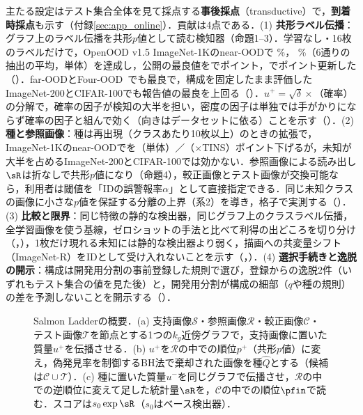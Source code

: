 主たる設定はテスト集合全体を見て採点する\textbf{事後採点}（transductive）で，\textbf{到着時採点}も示す（付録\ref{sec:app_online}）．貢献は4点である．(1) \textbf{共形ラベル伝播}：グラフ上のラベル伝播を共形$p$値として読む検知器（命題1--3）．学習なし・16枚のラベルだけで，OpenOOD v1.5 ImageNet-1Kのnear-OODで\AUC{} \NRAloneNearAuroc\%，\FPR{} \NRAloneNearFpr\%（6通りの抽出の平均，単体）を達成し，公開の最良値を\AUC{}で\NRAloneGapNearAuroc{}ポイント，\FPR{}で\NRAloneGapNearFpr{}ポイント更新した（）．far-OODとFour-OOD~\cite{huang2021mos}でも最良で，構成を固定したまま評価したImageNet-200とCIFAR-100でも報告値の最良を上回る（）．$u^{+}=\sqrt{\delta}\times$（確率）の分解で，確率の因子が検知の大半を担い，密度の因子は単独では手がかりにならず確率の因子と組んで効く（向きはデータセットに依る）ことを示す（）．(2) \textbf{種と参照画像}：種は再出現（クラスあたり10枚以上）のときの拡張で，ImageNet-1Kのnear-OODで\FPR{}を\NRvsLpAloneNearDAbs{}（単体）／\NRvsLpTinsNearDAbs{}（$\times$TINS）ポイント下げるが，未知が大半を占めるImageNet-200とCIFAR-100では効かない．参照画像による読み出し$\sR$は折なしで共形$p$値になり（命題4），較正画像とテスト画像が交換可能なら，利用者は閾値を「IDの誤警報率$\alpha$」として直接指定できる．同じ未知クラスの画像に小さな$p$値を保証する分離の上界（系2）を導き，格子で実測する（）．(3) \textbf{比較と限界}：同じ特徴の静的な検出器，同じグラフ上のクラスラベル伝播，全学習画像を使う基線，ゼロショットの手法と比べて利得の出どころを切り分け（，），1枚だけ現れる未知には静的な検出器より弱く，描画への共変量シフト（ImageNet-R）をIDとして受け入れないことを示す（，）．(4) \textbf{選択手続きと逸脱の開示}：構成は開発用分割の事前登録した規則で選び，登録からの逸脱2件（いずれもテスト集合の値を見た後）と，開発用分割が構成の細部（$q$や種の規則）の差を予測しないことを開示する（）．

\begin{figure}[t]
\centering
\scalebox{0.76}{}
\caption{Salmon Ladderの概要．(a) 支持画像$\mathcal{S}$・参照画像$\mathcal{R}$・較正画像$\mathcal{C}$・テスト画像$\mathcal{T}$を節点とする1つの$k_g$近傍グラフで，支持画像に置いた質量$u^{+}$を伝播させる．(b) $u^{+}$を$\mathcal{R}$の中での順位$p^{+}$（共形$p$値）に変え，偽発見率を制御するBH法で棄却された画像を種$\hat{Q}$とする（候補は$\mathcal{C}\cup\mathcal{T}$）．(c) 種に置いた質量$u^{-}$を同じグラフで伝播させ，$\mathcal{R}$の中での逆順位に変えて足した統計量$\sR$を，$\mathcal{C}$の中での順位$\pfin$で読む．スコアは$s_0\exp\sR$（$s_0$はベース検出器）．}
\label{fig:overview}
\end{figure}

